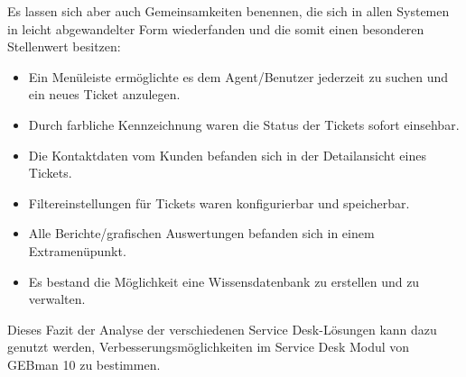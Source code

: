 \noindent
Es lassen sich aber auch Gemeinsamkeiten benennen, die sich in allen Systemen in leicht abgewandelter Form wiederfanden und die somit einen besonderen Stellenwert besitzen:

\begin{itemize}
\item Ein Menüleiste ermöglichte es dem Agent/Benutzer jederzeit zu suchen und ein neues Ticket anzulegen.
		 
\item Durch farbliche Kennzeichnung waren die Status der Tickets sofort einsehbar.
		
\item Die Kontaktdaten vom Kunden befanden sich in der Detailansicht eines Tickets.

\item Filtereinstellungen für Tickets waren konfigurierbar und speicherbar.

\item Alle Berichte/grafischen Auswertungen befanden sich in einem Extramenüpunkt.

\item Es bestand die Möglichkeit eine Wissensdatenbank zu erstellen und zu verwalten.
\end{itemize}

\noindent
Dieses Fazit der Analyse der verschiedenen Service Desk-Lösungen kann dazu genutzt werden, Verbesserungsmöglichkeiten im Service Desk Modul von GEBman 10 zu  bestimmen. 
